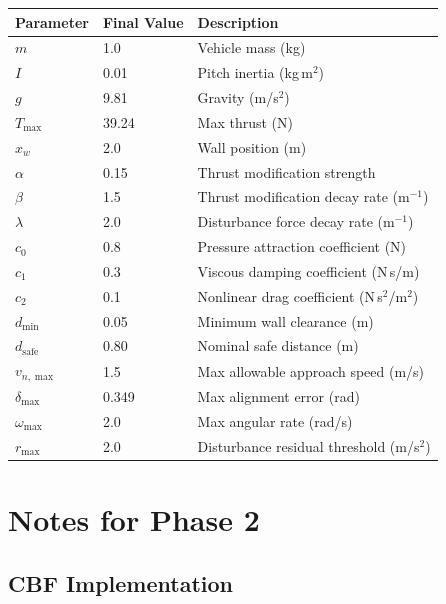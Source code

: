 \documentclass[12pt]{article}
\begin{document}
\begin{center}
\begin{tabular}{lll}
\toprule
\textbf{Parameter} & \textbf{Final Value} & \textbf{Description} \\
\midrule
$m$               & 1.0   & Vehicle mass (kg) \\
$I$               & 0.01  & Pitch inertia (kg\,m$^2$) \\
$g$               & 9.81  & Gravity (m/s$^2$) \\
$T_\mathrm{max}$  & 39.24 & Max thrust (N) \\
$x_w$             & 2.0   & Wall position (m) \\
$\alpha$          & 0.15  & Thrust modification strength \\
$\beta$           & 1.5   & Thrust modification decay rate (m$^{-1}$) \\
$\lambda$         & 2.0   & Disturbance force decay rate (m$^{-1}$) \\
$c_0$             & 0.8   & Pressure attraction coefficient (N) \\
$c_1$             & 0.3   & Viscous damping coefficient (N\,s/m) \\
$c_2$             & 0.1   & Nonlinear drag coefficient (N\,s$^2$/m$^2$) \\
$d_{\min}$          & 0.05  & Minimum wall clearance (m) \\
$d_\mathrm{safe}$ & 0.80  & Nominal safe distance (m) \\
$v_{n,\max}$      & 1.5   & Max allowable approach speed (m/s) \\
$\delta_{\max}$     & 0.349 & Max alignment error (rad) \\
$\omega_{\max}$     & 2.0   & Max angular rate (rad/s) \\
$r_{\max}$          & 2.0   & Disturbance residual threshold (m/s$^2$) \\
\bottomrule
\end{tabular}
\end{center}

\section{Notes for Phase 2}

\subsection{CBF Implementation}
\end{document}
